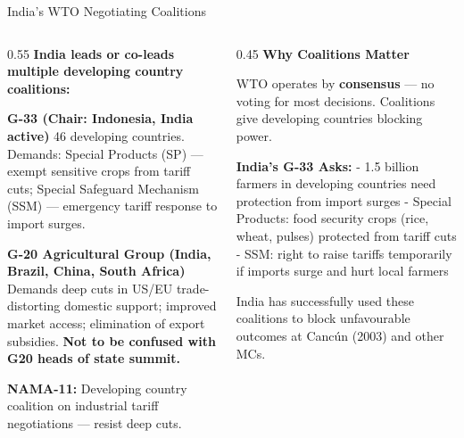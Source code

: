 \documentclass[
  ignorenonframetext,
  aspectratio=169,
]{beamer}
\makeatletter
\let\quarto@originallabel\label
\DeclareRobustCommand*{\label}[1]{\quarto@originallabel{#1}}
\makeatother
\begin{document}
\begin{frame}{India's WTO Negotiating Coalitions}
\label{indias-wto-negotiating-coalitions}
\begin{columns}[T]
\begin{column}{0.55\linewidth}
\textbf{India leads or co-leads multiple developing country coalitions:}

\textbf{G-33 (Chair: Indonesia, India active)} 46 developing countries.
Demands: Special Products (SP) --- exempt sensitive crops from tariff
cuts; Special Safeguard Mechanism (SSM) --- emergency tariff response to
import surges.

\textbf{G-20 Agricultural Group (India, Brazil, China, South Africa)}
Demands deep cuts in US/EU trade-distorting domestic support; improved
market access; elimination of export subsidies. \textbf{Not to be
confused with G20 heads of state summit.}

\textbf{NAMA-11:} Developing country coalition on industrial tariff
negotiations --- resist deep cuts.
\end{column}

\begin{column}{0.45\linewidth}
\textbf{Why Coalitions Matter}

WTO operates by \textbf{consensus} --- no voting for most decisions.
Coalitions give developing countries blocking power.

\textbf{India's G-33 Asks:} - 1.5 billion farmers in developing
countries need protection from import surges - Special Products: food
security crops (rice, wheat, pulses) protected from tariff cuts - SSM:
right to raise tariffs temporarily if imports surge and hurt local
farmers

India has successfully used these coalitions to block unfavourable
outcomes at Cancún (2003) and other MCs.
\end{column}
\end{columns}
\end{frame}
\end{document}
